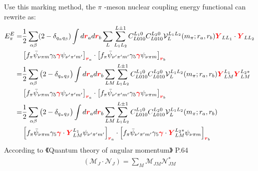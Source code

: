 \documentclass[a4paper]{article}
\newcommand{\no}{\nonumber}
\newcommand{\bmm}[1]{{\color{red}\bm{#1}}}
\begin{document}
Use this marking method, the $\pi$ -meson nuclear coupling energy functional can rewrite as:
\begin{align}
\no E_{\pi}^{E}=&\frac{1}{2}\sum_{\alpha\beta}(2-\delta_{q_{\alpha}q_{\beta}})\int d\bmm{r}_{a}d\bmm{r}_{b}\sum_{L}\sum_{L_{1}L_{2}}^{L\pm1}C_{L010}^{L_{1}0}C_{L010}^{L_{2}0}\mathcal{V}_{L}^{L_1L_2}(m_{\pi};r_{a},r_{b})\bmm{Y}_{LL_{1}}\cdot\bmm{Y}_{LL_{2}}\\
\no&\left[f_{\pi}\bar{\psi}_{\nu\pi m}\gamma_{5}\bmm{\gamma}\psi_{\nu'\pi'm'}\right]_{\bmm{r}_{a}}\cdot\left[f_{\pi}\bar{\psi}_{\nu'\pi'm'}\gamma_{5}\bmm{\gamma}\psi_{\nu\pi m}\right]_{\bmm{r}_{b}}\\
\no=&\frac{1}{2}\sum_{\alpha\beta}\left(2-\delta_{q_{\alpha}q_{\beta}}\right)\int d\bmm{r}_{a}d\bmm{r}_{b}\sum_{LM}\sum_{L_{1}L_{2}}^{L\pm1}C_{L010}^{L_{1}0}C_{L010}^{L_{2}0}\mathcal{V}_{L}^{L_{1}L_{2}}(m_{\pi};r_{a},r_{b})\bmm{Y}_{LM}^{L_{1}}\bmm{Y}_{LM}^{L_{2}*}\\
\no&\left[f_{\pi}\bar{\psi}_{\nu\pi m}\gamma_{5}\bmm{\gamma}\psi_{\nu'\pi'm'}\right]_{\bmm{r}_{a}}\cdot\left[f_{\pi}\bar{\psi}_{\nu'\pi'm'}\gamma_{5}\bmm{\gamma}\psi_{\nu\pi m}\right]_{\bmm{r}_{b}}\\
\no=&\frac{1}{2}\sum_{\alpha\beta}\left(2-\delta_{q_{\alpha}q_{\beta}}\right)\int d\bmm{r}_{a}d\bmm{r}_{b}\sum_{LM}\sum_{L_{1}L_{2}}^{L\pm1}C_{L010}^{L_{1}0}C_{L010}^{L_{2}0}\mathcal{V}_{L}^{L_{1}L_{2}}(m_{\pi};r_{a},r_{b})\\
\no&\left[f_{\pi}\bar{\psi}_{\nu\pi m}\gamma_{5}\bmm{\gamma}\cdot\bmm{Y}_{LM}^{L_{1}}\psi_{\nu'\pi'm'}\right]_{\bmm{r}_{a}}\cdot\left[f_{\pi}\bar{\psi}_{\nu'\pi'm'}\gamma_{5}\bmm{\gamma}\cdot\bmm{Y}_{LM}^{L_{2}*}\psi_{\nu\pi m}\right]_{\bmm{r}_{b}}
\end{align}
According to 《Quantum theory of angular momentum》 P.64
\begin{align}
\left(\mathscr{M}_{J}\cdot\mathscr{N}_{J}\right)=\sum_{M}\mathscr{M}_{JM}\mathscr{N}_{JM}^{*}
\end{align}
\end{document}

